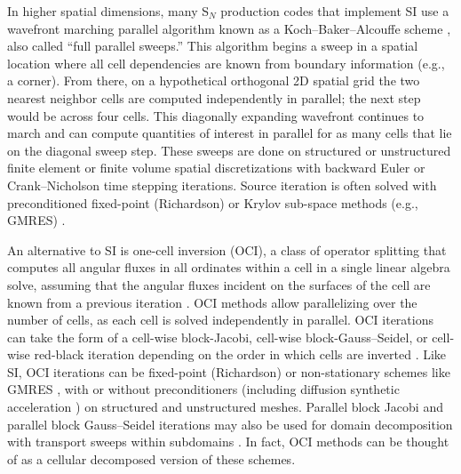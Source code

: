 In higher spatial dimensions, many S$_N$ production codes that implement SI use a wavefront marching parallel algorithm known as a Koch--Baker--Alcouffe scheme \cite{baker_kba_2017}, also called ``full parallel sweeps.''
This algorithm begins a sweep in a spatial location where all cell dependencies are known from boundary information (e.g., a corner).
From there, on a hypothetical orthogonal 2D spatial grid the two nearest neighbor cells are computed independently in parallel; the next step would be across four cells.
This diagonally expanding wavefront continues to march and can compute quantities of interest in parallel for as many cells that lie on the diagonal sweep step.
These sweeps are done on structured or unstructured finite element or finite volume spatial discretizations with backward Euler or Crank--Nicholson time stepping iterations.
Source iteration is often solved with preconditioned fixed-point (Richardson) or Krylov sub-space methods (e.g., GMRES) \cite{adams_fast_2002}.

An alternative to SI is one-cell inversion (OCI), a class of operator splitting that computes all angular fluxes in all ordinates within a cell in a single linear algebra solve, assuming that the angular fluxes incident on the surfaces of the cell are known from a previous iteration \cite{kang2000oci}.
OCI methods allow parallelizing over the number of cells, as each cell is solved independently in parallel.
OCI iterations can take the form of a cell-wise block-Jacobi, cell-wise block-Gauss--Seidel, or cell-wise red-black iteration depending on the order in which cells are inverted \cite{man1994parallel}.
Like SI, OCI iterations can be fixed-point (Richardson) or non-stationary schemes like GMRES \cite{kylov2004warsa}, with or without preconditioners (including diffusion synthetic acceleration \cite{kang2000oci}) on structured and unstructured meshes.
Parallel block Jacobi and parallel block Gauss--Seidel iterations may also be used for domain decomposition with transport sweeps within subdomains \cite{qiao_improved_2021}.
In fact, OCI methods can be thought of as a cellular decomposed version of these schemes.

